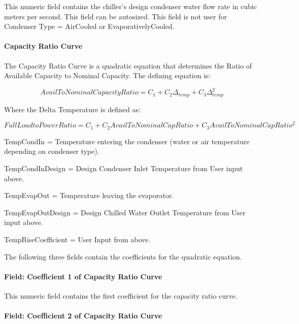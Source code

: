 This numeric field contains the chiller's design condenser water flow rate in cubic meters per second. This field can be autosized. This field is not user for Condenser Type = AirCooled or EvaporativelyCooled.

\paragraph{Capacity Ratio Curve}\label{capacity-ratio-curve-1}

The Capacity Ratio Curve is a quadratic equation that determines the Ratio of Available Capacity to Nominal Capacity. The defining equation is:

\begin{equation}
    AvailToNominalCapacityRatio = {C_1} + {C_2}{\Delta_{temp}} + {C_3}\Delta_{temp}^2
\end{equation}

Where the Delta Temperature is defined as:

\begin{equation}
    FullLoadtoPowerRatio = {C_1} + {C_2}AvailToNominalCapRatio + {C_3}AvailToNominalCapRati{o^2}
\end{equation}

TempCondIn = Temperature entering the condenser (water or air temperature depending on condenser type).

TempCondInDesign = Design Condenser Inlet Temperature from User input above.

TempEvapOut = Temperature leaving the evaporator.

TempEvapOutDesign = Design Chilled Water Outlet Temperature from User input above.

TempRiseCoefficient = User Input from above.

The following three fields contain the coefficients for the quadratic equation.

\paragraph{Field: Coefficient 1 of Capacity Ratio Curve}\label{field-coefficient-1-of-capacity-ratio-curve-1}

This numeric field contains the first coefficient for the capacity ratio curve.

\paragraph{Field: Coefficient 2 of Capacity Ratio Curve}\label{field-coefficient-2-of-capacity-ratio-curve-1}


